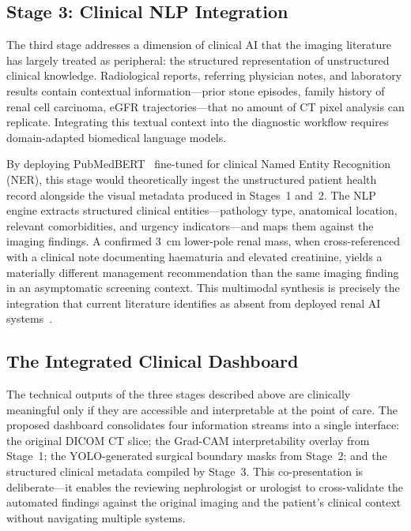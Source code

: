 \subsection{Stage 3: Clinical NLP Integration}
\label{subsec:stage3_nlp}

The third stage addresses a dimension of clinical AI that the imaging literature has largely treated as peripheral: the structured representation of unstructured clinical knowledge. Radiological reports, referring physician notes, and laboratory results contain contextual information---prior stone episodes, family history of renal cell carcinoma, eGFR trajectories---that no amount of CT pixel analysis can replicate. Integrating this textual context into the diagnostic workflow requires domain-adapted biomedical language models.

By deploying PubMedBERT~\cite{gu2021domain} fine-tuned for clinical Named Entity Recognition (NER), this stage would theoretically ingest the unstructured patient health record alongside the visual metadata produced in Stages~1 and~2. The NLP engine extracts structured clinical entities---pathology type, anatomical location, relevant comorbidities, and urgency indicators---and maps them against the imaging findings. A confirmed 3~cm lower-pole renal mass, when cross-referenced with a clinical note documenting haematuria and elevated creatinine, yields a materially different management recommendation than the same imaging finding in an asymptomatic screening context. This multimodal synthesis is precisely the integration that current literature identifies as absent from deployed renal AI systems~\cite{sreenivas2025enhancing}.

\subsection{The Integrated Clinical Dashboard}
\label{subsec:unified_dashboard}

The technical outputs of the three stages described above are clinically meaningful only if they are accessible and interpretable at the point of care. The proposed dashboard consolidates four information streams into a single interface: the original DICOM CT slice; the Grad-CAM interpretability overlay from Stage~1; the YOLO-generated surgical boundary masks from Stage~2; and the structured clinical metadata compiled by Stage~3. This co-presentation is deliberate---it enables the reviewing nephrologist or urologist to cross-validate the automated findings against the original imaging and the patient's clinical context without navigating multiple systems.

